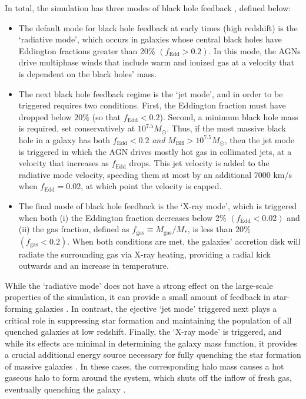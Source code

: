 \documentclass[twocolumn, linenumbers]{aastex631}
\newcommand{\fgas}{f_{\text{gas}}}
\newcommand{\mgas}{M_{\text{gas}}}
\newcommand{\mbh}{M_{\text{BH}}}
\newcommand{\fedd}{f_{\text{Edd}}}
\begin{document}
In total, the simulation has three modes of black hole feedback \citep{simba}, defined below:
\begin{itemize}[leftmargin=*]
\item[(1)] The default mode for black hole feedback at early times (high redshift) is the `radiative mode', which occurs in galaxies whose central black holes have Eddington fractions greater than 20\% $(\fedd>0.2)$.  In this mode, the AGNs drive multiphase winds that include warm and ionized gas at a velocity that is dependent on the black holes' mass.

\item[(2)] The next black hole feedback regime is the `jet mode', and in order to be triggered requires two conditions.  First, the Eddington fraction must have dropped below $20\%$ (so that $\fedd<0.2$).  Second, a minimum black hole mass is required, set conservatively at $10^{7.5}M_\odot$.  Thus, if the most massive black hole in a galaxy has both $\fedd<0.2$ \textit{and} $\mbh>10^{7.5}M_\odot$, then the jet mode is triggered in which the AGN drives mostly hot gas in collimated jets, at a velocity that increases as $\fedd$ drops.  This jet velocity is added to the radiative mode velocity, speeding them at most by an additional 7000 km/s when $\fedd=0.02$, at which point the velocity is capped.


\item[(3)] The final mode of black hole feedback is the `X-ray mode', which is triggered when both (i) the Eddington fraction decreases below 2\% $(\fedd<0.02)$ and (ii) the gas fraction, defined as $\fgas\equiv \mgas/M_{*}$, is less than 20\% $(\fgas<0.2)$.  When both conditions are met, the galaxies' accretion disk will radiate the surrounding gas via X-ray heating, providing a radial kick outwards and an increase in temperature.
\end{itemize}

While the `radiative mode' does not have a strong effect on the large-scale properties of the simulation, it can provide a small amount of feedback in star-forming galaxies \citep{dave20}.  In contrast, the ejective `jet mode' triggered next plays a critical role in suppressing star formation and maintaining the population of all quenched galaxies at low redshift.  Finally, the `X-ray mode' is triggered, and while its effects are minimal in determining the galaxy mass function, it provides a crucial additional energy source necessary for fully quenching the star formation of massive galaxies \citep{simba}.  In these cases, the corresponding halo mass causes a hot gaseous halo to form around the system, which shuts off the inflow of fresh gas, eventually quenching the galaxy \citep{Hardcastle07}.
\end{document}
